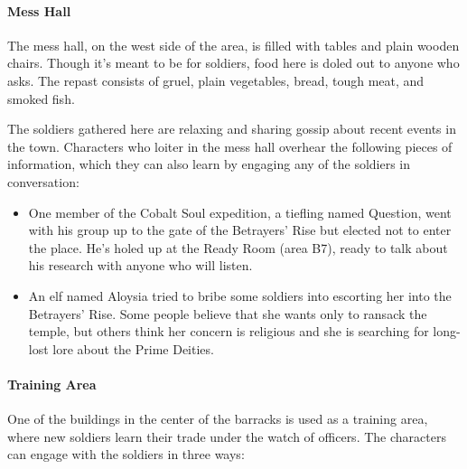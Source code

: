 \documentclass[letterpaper, 11pt, bg=full, twocolumn]{dndbook}
\begin{document}
\paragraph{Mess Hall}

The mess hall, on the west side of the area, is filled with tables and plain wooden chairs. Though it's meant to be for soldiers, food here is doled out to anyone who asks. The repast consists of gruel, plain vegetables, bread, tough meat, and smoked fish.

The soldiers gathered here are relaxing and sharing gossip about recent events in the town. Characters who loiter in the mess hall overhear the following pieces of information, which they can also learn by engaging any of the soldiers in conversation:

\begin{itemize}
\item One member of the Cobalt Soul expedition, a tiefling named Question, went with his group up to the gate of the Betrayers' Rise but elected not to enter the place. He's holed up at the Ready Room (area B7), ready to talk about his research with anyone who will listen.
\item An elf named Aloysia tried to bribe some soldiers into escorting her into the Betrayers' Rise. Some people believe that she wants only to ransack the temple, but others think her concern is religious and she is searching for long-lost lore about the Prime Deities.
\end{itemize}

\paragraph{Training Area}

One of the buildings in the center of the barracks is used as a training area, where new soldiers learn their trade under the watch of officers. The characters can engage with the soldiers in three ways:
\end{document}

